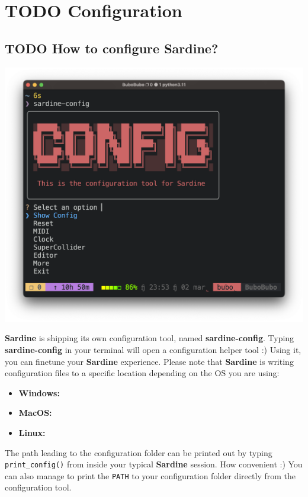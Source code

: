 \documentclass[11pt]{article}
\begin{document}
\section{{\bfseries\sffamily TODO} Configuration}
\label{sec:org070c6c7}
\subsection{{\bfseries\sffamily TODO} How to configure Sardine?}
\label{sec:org37c0091}

\begin{center}
\includegraphics[width=.9\linewidth]{sardine_config.png}
\end{center}

\textbf{Sardine} is shipping its own configuration tool, named \textbf{sardine-config}. Typing \textbf{sardine-config} in your terminal will open a configuration helper tool :) Using it, you can finetune your \textbf{Sardine} experience. Please note that \textbf{Sardine} is writing configuration files to a specific location depending on the OS you are using:
\begin{itemize}
\item \textbf{Windows:}
\item \textbf{MacOS:}
\item \textbf{Linux:}
\end{itemize}

The path leading to the configuration folder can be printed out by typing \texttt{print\_config()} from inside your typical \textbf{Sardine} session. How convenient :) You can also manage to print the \texttt{PATH} to your configuration folder directly from the configuration tool.
\end{document}
